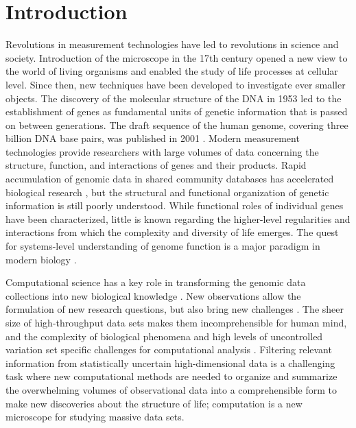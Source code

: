 \chapter{Introduction}
\label{chap:intro}

Revolutions in measurement technologies have led to revolutions in
science and society. Introduction of the microscope in the 17th
century opened a new view to the world of living organisms and enabled
the study of life processes at cellular level. Since then, new
techniques have been developed to investigate ever smaller objects.
The discovery of the molecular structure of the DNA in 1953
\citep{Watson53nature} led to the establishment of genes as
fundamental units of genetic information that is passed on between
generations. The draft sequence of the human genome, covering three
billion DNA base pairs, was published in 2001 \citep{Lander01,
  Venter01}. Modern measurement technologies provide researchers with
large volumes of data concerning the structure, function, and
interactions of genes and their products.  Rapid accumulation of
genomic data in shared community databases has accelerated biological
research \citep{Cochrane2010}, but the structural and functional
organization of genetic information is still poorly understood.  While
functional roles of individual genes have been characterized, little
is known regarding the higher-level regularities and interactions from
which the complexity and diversity of life emerges. The quest for
systems-level understanding of genome function is a major paradigm in
modern biology \citep{Collins03}.

Computational science has a key role in transforming the genomic data
collections into new biological knowledge \citep{Cohen04}. New
observations allow the formulation of new research questions, but also
bring new challenges \citep{Barbour05}.  The sheer size of
high-throughput data sets makes them incomprehensible for human mind,
and the complexity of biological phenomena and high levels of
uncontrolled variation set specific challenges for computational
analysis \citep{Tilstone03, Troyanskaya05}. Filtering relevant
information from statistically uncertain high-dimensional data is a
challenging task where new computational methods are needed to
organize and summarize the overwhelming volumes of observational data
into a comprehensible form to make new discoveries about the structure
of life; computation is a new microscope for studying massive data
sets.

